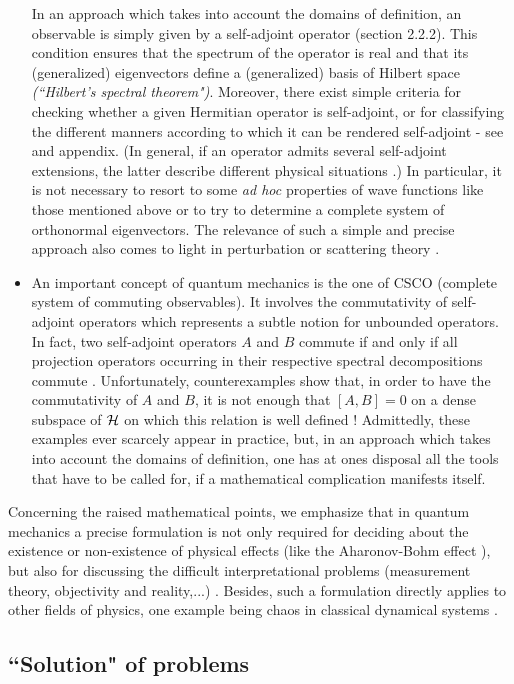 \documentclass[12pt]{report}
\begin{document}
\begin{itemize}
In an approach which takes into account the domains of definition, 
an observable is simply given by a self-adjoint operator 
(section 2.2.2). This condition ensures that 
the spectrum of the operator is real and that its (generalized)
eigenvectors define a (generalized) basis of Hilbert space
{\em (``Hilbert's spectral theorem")}.
Moreover, there exist simple criteria for checking
whether a given Hermitian 
operator is self-adjoint, or for classifying 
the different manners according to 
which it can be rendered self-adjoint
- see \cite{rs,sg,th} and appendix. (In general, 
if an operator admits several self-adjoint extensions, 
the latter describe different physical situations
\cite{aw,rs}.) In particular, it is not necessary 
to resort to some {\em ad hoc} properties of wave functions like those 
mentioned above or to try to determine a complete system of 
orthonormal eigenvectors. 
The relevance of such a simple and precise approach 
also comes to light in perturbation \cite{th,klau}
or scattering theory \cite{amj}. 
\item
An important concept of quantum mechanics is the one of CSCO
(complete system of commuting observables). 
It involves the commutativity of self-adjoint operators 
which represents a subtle notion for unbounded operators. 
In fact, two self-adjoint operators $A$ and $B$ commute if and only if 
all projection operators occurring in their respective 
spectral decompositions commute \cite{rs}.
Unfortunately, counterexamples show that, in order to have  
the commutativity of $A$ and $B$, 
it is not enough that $[A,B] =0$ on a
dense  subspace of ${\cal H}$ on which this relation 
is well defined \cite{rs}!
Admittedly, these examples ever scarcely  appear in practice, 
but, in an approach which takes into account the domains
of definition, one has at ones disposal all the tools 
that have to be called for, if a mathematical complication 
manifests itself. 
\end{itemize}
Concerning the raised mathematical points, we emphasize that 
in quantum mechanics a precise formulation is not  
only required for deciding about the existence or non-existence
of physical effects (like the Aharonov-Bohm effect \cite{ab}),
but also for discussing the difficult interpretational problems
(measurement theory, objectivity and reality,...) \cite{au}. 
Besides, such a formulation 
directly applies to other fields of physics, one example being 
chaos in classical dynamical systems \cite{pri}.
 
\subsection{``Solution" of problems}
\end{document}
